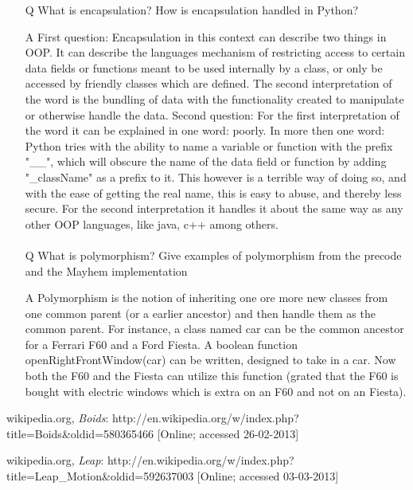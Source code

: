 \documentclass{article}
\begin{document}
\begin{itemize}
\paragraph{}
\item[Q] 
What is encapsulation? How is encapsulation handled in Python?
\item[A]
First question: Encapsulation in this context can describe two things in OOP. It can describe the languages mechanism of restricting access to certain data fields or functions meant to be used internally by a class, or only be accessed by friendly classes which are defined. The second interpretation of the word is the bundling of data with the functionality created to manipulate or otherwise handle the data.
Second question: For the first interpretation of the word it can be explained in one word: poorly. In more then one word: Python tries with the ability to name a variable or function with the prefix "\_\_", which will obscure the name of the data field or function by adding "\_className" as a prefix to it. This however is a terrible way of doing so, and with the ease of getting the real name, this is easy to abuse, and thereby less secure.
 For the second interpretation it handles it about the same way as any other OOP languages, like java, c++ among others.
\paragraph{}
\item[Q]
What is polymorphism? Give examples of polymorphism from the precode and the Mayhem implementation
\item[A]
Polymorphism is the notion of inheriting one ore more new classes from one common parent (or a earlier ancestor) and then handle them as the common parent. For instance, a class named car can be the common ancestor for a Ferrari F60 and a Ford Fiesta. A boolean function openRightFrontWindow(car) can be written, designed to take in a car. Now both the F60 and the Fiesta can utilize this function (grated that the F60 is bought with electric windows which is extra on an F60 and not on an Fiesta).
\end{itemize}


\begin{thebibliography}{9}

  wikipedia.org,
  \emph{Boids}:
  http://en.wikipedia.org/w/index.php?title=Boids\&oldid=580365466 
  [Online; accessed 26-02-2013]
  
  wikipedia.org,
  \emph{Leap}:
  http://en.wikipedia.org/w/index.php?title=Leap\_Motion\&oldid=592637003
  [Online; accessed 03-03-2013]
  

\end{thebibliography}
\end{document}

